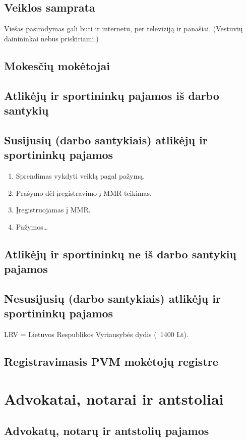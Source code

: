 \subsection{Veiklos samprata}

Viešas pasirodymas gali būti ir internetu, per televiziją ir panašiai.
(Vestuvių dainininkai nebus priskiriami.)

\subsection{Mokesčių mokėtojai}

\subsection{Atlikėjų ir sportininkų pajamos iš darbo santykių}

\subsection{Susijusių (darbo santykiais) atlikėjų ir sportininkų pajamos}

\begin{enumerate}
  \item Sprendimas vykdyti veiklą pagal pažymą.
  \item Prašymo dėl įregistravimo į MMR teikimas.
  \item Įregistruojamas į MMR.
  \item Pažymos…
\end{enumerate}

\subsection{Atlikėjų ir sportininkų ne iš darbo santykių pajamos}

\subsection{Nesusijusių (darbo santykiais) atlikėjų ir sportininkų
pajamos}

LRV = Lietuvos Respublikos Vyriausybės dydis (~1400 Lt).

\subsection{Registravimasis PVM mokėtojų registre}

\section{Advokatai, notarai ir antstoliai}

\subsection{Advokatų, notarų ir antstolių pajamos}


